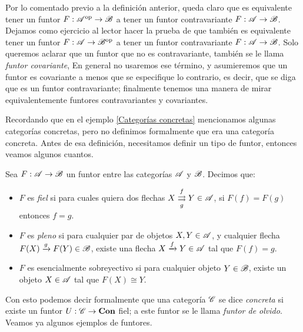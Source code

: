 \documentclass{comunicaciones}
\begin{document}
Por lo comentado previo a la definición anterior, queda claro que es equivalente tener un funtor $F:\mathscr A^{\mathrm{op}}\to\mathscr B$ a tener un funtor contravariante $F:\mathscr A\to\mathscr B$.
Dejamos como ejercicio al lector hacer la prueba de que también es equivalente tener un funtor $F:\mathscr A\to\mathscr B^{\mathrm{op}}$ a tener un funtor contravariante $F:\mathscr A\to\mathscr B$.
Solo queremos aclarar que un funtor que no es contravariante, también se le llama \emph{funtor covariante}, En general no usaremos ese término,
y asumieremos que un funtor es covariante a menos que se especifique lo contrario, es decir, que se diga que es un funtor contravariante; finalmente tenemos
una manera de mirar equivalentemente funtores contravariantes y covariantes.

Recordando que en el ejemplo \ref{Categorías concretas} mencionamos algunas categorías concretas, pero no definimos formalmente que era una categoría concreta.
Antes de esa definición, necesitamos definir un tipo de funtor, entonces veamos algunos cuantos.

\begin{dfn}
    Sea $F:\mathscr A\to\mathscr B$ un funtor entre las categorías $\mathscr A$ y $\mathscr B$. Decimos que:
    \begin{itemize}
        \item $F$ es \emph{fiel} si para cuales quiera dos flechas $X\overset{f}{\underset{g}{\rightrightarrows}}Y\in\mathscr A$, si $F(f)=F(g)$ entonces $f=g$.
        \item $F$ es \emph{pleno} si para cualquier par de objetos $X,Y\in\mathscr A$, y cualquier flecha $F(X)\xrightarrow{g}F(Y)\in\mathscr B$, existe una flecha 
        $X\xrightarrow{f}Y\in\mathscr A$ tal que $F(f)=g$.
        \item $F$ es esencialmente sobreyectivo si para cualquier objeto $Y\in\mathscr B$, existe un objeto $X\in\mathscr A$ tal que $F(X)\cong Y$.
    \end{itemize}
\end{dfn}

Con esto podemos decir formalmente que una categoría $\mathscr C$ se dice \emph{concreta} si existe un funtor $U:\mathscr C\to\mathbf{Con}$ fiel; a este funtor se le llama 
\emph{funtor de olvido}. Veamos ya algunos ejemplos de funtores.
\end{document}
